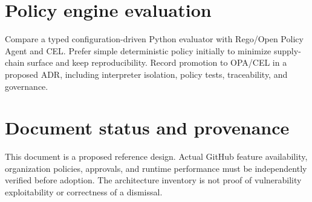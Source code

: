 \documentclass[11pt,letterpaper]{article}
\begin{document}
\section{Policy engine evaluation}
Compare a typed configuration-driven Python evaluator with Rego/Open Policy Agent and CEL. Prefer simple deterministic policy initially to minimize supply-chain surface and keep reproducibility. Record promotion to OPA/CEL in a proposed ADR, including interpreter isolation, policy tests, traceability, and governance.


\section*{Document status and provenance}
This document is a proposed reference design. Actual GitHub feature availability, organization policies, approvals, and runtime performance must be independently verified before adoption. The architecture inventory is not proof of vulnerability exploitability or correctness of a dismissal.
\end{document}
